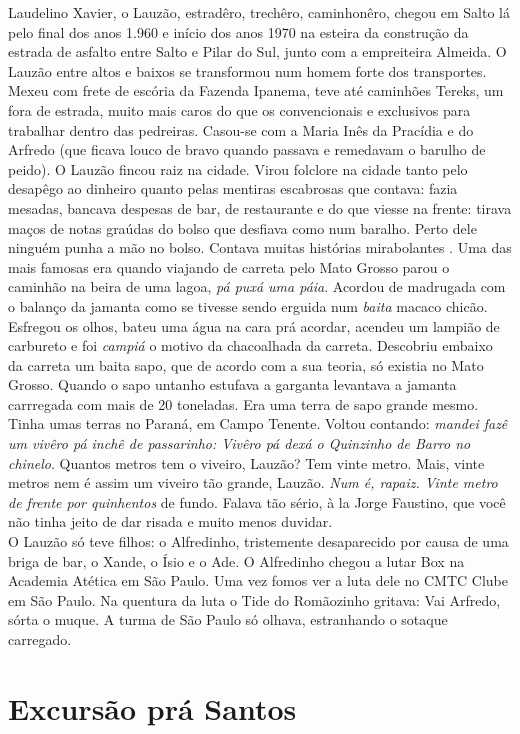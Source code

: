 \documentclass[12pt,brazil,]{book}
\begin{document}
Laudelino Xavier, o Lauzão, estradêro, trechêro, caminhonêro, chegou em
Salto lá pelo final dos anos 1.960 e início dos anos 1970 na esteira da
construção da estrada de asfalto entre Salto e Pilar do Sul, junto com a
empreiteira Almeida. O Lauzão entre altos e baixos se transformou num
homem forte dos transportes. Mexeu com frete de escória da Fazenda
Ipanema, teve até caminhões Tereks, um fora de estrada, muito mais caros
do que os convencionais e exclusivos para trabalhar dentro das
pedreiras. Casou-se com a Maria Inês da Pracídia e do Arfredo (que
ficava louco de bravo quando passava e remedavam o barulho de peido). O
Lauzão fincou raiz na cidade. Virou folclore na cidade tanto pelo
desapêgo ao dinheiro quanto pelas mentiras escabrosas que contava: fazia
mesadas, bancava despesas de bar, de restaurante e do que viesse na
frente: tirava maços de notas graúdas do bolso que desfiava como num
baralho. Perto dele ninguém punha a mão no bolso. Contava muitas
histórias mirabolantes . Uma das mais famosas era quando viajando de
carreta pelo Mato Grosso parou o caminhão na beira de uma lagoa,
\emph{pá puxá uma páia}. Acordou de madrugada com o balanço da jamanta
como se tivesse sendo erguida num \emph{baita} macaco chicão. Esfregou
os olhos, bateu uma água na cara prá acordar, acendeu um lampião de
carbureto e foi \emph{campiá} o motivo da chacoalhada da carreta.
Descobriu embaixo da carreta um baita sapo, que de acordo com a sua
teoria, só existia no Mato Grosso. Quando o sapo untanho estufava a
garganta levantava a jamanta carrregada com mais de 20 toneladas. Era
uma terra de sapo grande mesmo.\\
Tinha umas terras no Paraná, em Campo Tenente. Voltou contando:
\emph{mandei fazê um vivêro pá inchê de passarinho: Vivêro pá dexá o
Quinzinho de Barro no chinelo}. Quantos metros tem o viveiro, Lauzão?
Tem vinte metro. Mais, vinte metros nem é assim um viveiro tão grande,
Lauzão. \emph{Num é, rapaiz. Vinte metro de frente por quinhentos} de
fundo. Falava tão sério, à la Jorge Faustino, que você não tinha jeito
de dar risada e muito menos duvidar.\\
O Lauzão só teve filhos: o Alfredinho, tristemente desaparecido por
causa de uma briga de bar, o Xande, o Ísio e o Ade. O Alfredinho chegou
a lutar Box na Academia Atética em São Paulo. Uma vez fomos ver a luta
dele no CMTC Clube em São Paulo. Na quentura da luta o Tide do
Romãozinho gritava: Vai Arfredo, sórta o muque. A turma de São Paulo só
olhava, estranhando o sotaque carregado.

\section{Excursão prá Santos}\label{excursuxe3o-pruxe1-santos}
\end{document}
